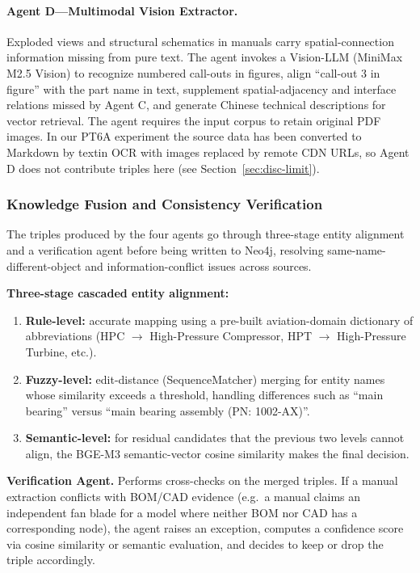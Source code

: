\documentclass[applsci,article,submit,pdftex,moreauthors]{Definitions/mdpi}
\begin{document}
\paragraph{Agent D---Multimodal Vision Extractor.} Exploded views and structural schematics in manuals carry spatial-connection information missing from pure text. The agent invokes a Vision-LLM (MiniMax M2.5 Vision) to recognize numbered call-outs in figures, align ``call-out 3 in figure'' with the part name in text, supplement spatial-adjacency and interface relations missed by Agent C, and generate Chinese technical descriptions for vector retrieval. The agent requires the input corpus to retain original PDF images. In our PT6A experiment the source data has been converted to Markdown by textin OCR with images replaced by remote CDN URLs, so Agent D does not contribute triples here (see Section~\ref{sec:disc-limit}).

\subsubsection{Knowledge Fusion and Consistency Verification}
\label{sec:kg-fusion}

The triples produced by the four agents go through three-stage entity alignment and a verification agent before being written to Neo4j, resolving same-name-different-object and information-conflict issues across sources.

\textbf{Three-stage cascaded entity alignment:}
\begin{enumerate}
\item \textbf{Rule-level:} accurate mapping using a pre-built aviation-domain dictionary of abbreviations (HPC $\rightarrow$ High-Pressure Compressor, HPT $\rightarrow$ High-Pressure Turbine, etc.).
\item \textbf{Fuzzy-level:} edit-distance (SequenceMatcher) merging for entity names whose similarity exceeds a threshold, handling differences such as ``main bearing'' versus ``main bearing assembly (PN: 1002-AX)''.
\item \textbf{Semantic-level:} for residual candidates that the previous two levels cannot align, the BGE-M3 semantic-vector cosine similarity makes the final decision.
\end{enumerate}

\textbf{Verification Agent.} Performs cross-checks on the merged triples. If a manual extraction conflicts with BOM/CAD evidence (e.g.\ a manual claims an independent fan blade for a model where neither BOM nor CAD has a corresponding node), the agent raises an exception, computes a confidence score via cosine similarity or semantic evaluation, and decides to keep or drop the triple accordingly.
\end{document}
